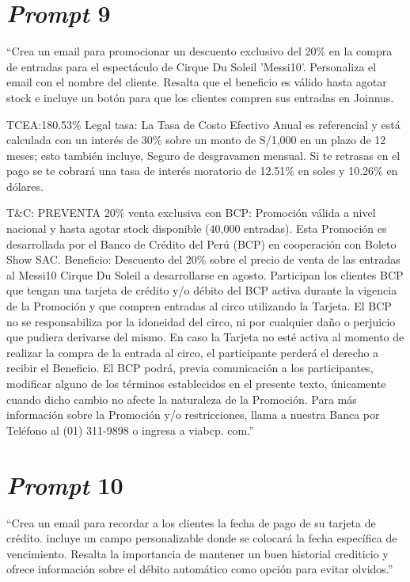 \section{\textit{Prompt} 9}

``Crea un email para promocionar un descuento exclusivo del 20\% en la compra de entradas para el espectáculo de Cirque Du Soleil 'Messi10'. Personaliza el email con el nombre del cliente. Resalta que el beneficio es válido hasta agotar stock e incluye un botón para que los clientes compren sus entradas en Joinnus.

TCEA:180.53\%
Legal tasa: La Tasa de Costo Efectivo Anual es referencial y está calculada con un interés de 30\% sobre un monto de S/1,000 en un plazo de 12 meses; esto también incluye, Seguro de desgravamen mensual. Si te retrasas en el pago se te cobrará una tasa de interés moratorio de 12.51\% en soles y 10.26\% en dólares.

T\&C: PREVENTA 20\% venta exclusiva con BCP: Promoción válida a nivel nacional y hasta agotar stock disponible (40,000 entradas). Esta Promoción es desarrollada por el Banco de Crédito del Perú (BCP) en cooperación con Boleto Show SAC. Beneficio: Descuento del 20\% sobre el precio de venta de las entradas al Messi10 Cirque Du Soleil a desarrollarse en agosto. Participan los clientes BCP que tengan una tarjeta de crédito y/o débito del BCP activa durante la vigencia de la Promoción y que compren entradas al circo utilizando la Tarjeta. El BCP no se responsabiliza por la idoneidad del circo, ni por cualquier daño o perjuicio que pudiera derivarse del mismo. En caso la Tarjeta no esté activa al momento de realizar la compra de la entrada al circo, el participante perderá el derecho a recibir el Beneficio. El BCP podrá, previa comunicación a los participantes, modificar alguno de los términos establecidos en el presente texto, únicamente cuando dicho cambio no afecte la naturaleza de la Promoción. Para más información sobre la Promoción y/o restricciones, llama a nuestra Banca por Teléfono al (01) 311-9898 o ingresa a viabcp. com.''

\section{\textit{Prompt} 10}

``Crea un email para recordar a los clientes la fecha de pago de su tarjeta de crédito. incluye un campo personalizable donde se colocará la fecha específica de vencimiento. Resalta la importancia de mantener un buen historial crediticio y ofrece información sobre el débito automático como opción para evitar olvidos.''


